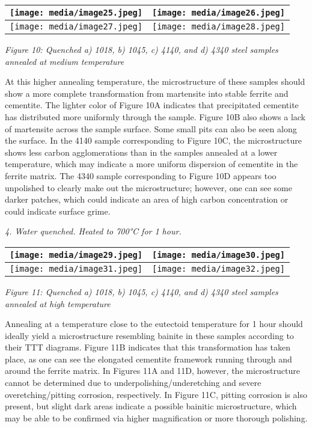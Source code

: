 \documentclass[]{article}
\begin{document}
\begin{longtable}[]{@{}ll@{}}
\toprule
\texttt{[image: media/image25.jpeg]} &
\texttt{[image: media/image26.jpeg]}\tabularnewline
\midrule
\endhead
\texttt{[image: media/image27.jpeg]} &
\texttt{[image: media/image28.jpeg]}\tabularnewline
\bottomrule
\end{longtable}

\emph{Figure 10: Quenched a) 1018, b) 1045, c) 4140, and d) 4340 steel
samples annealed at medium temperature}

At this higher annealing temperature, the microstructure of these
samples should show a more complete transformation from martensite into
stable ferrite and cementite. The lighter color of Figure 10A indicates
that precipitated cementite has distributed more uniformly through the
sample. Figure 10B also shows a lack of martensite across the sample
surface. Some small pits can also be seen along the surface. In the 4140
sample corresponding to Figure 10C, the microstructure shows less carbon
agglomerations than in the samples annealed at a lower temperature,
which may indicate a more uniform dispersion of cementite in the ferrite
matrix. The 4340 sample corresponding to Figure 10D appears too
unpolished to clearly make out the microstructure; however, one can see
some darker patches, which could indicate an area of high carbon
concentration or could indicate surface grime.

\emph{4. Water quenched. Heated to 700°C for 1 hour.}

\begin{longtable}[]{@{}ll@{}}
\toprule
\texttt{[image: media/image29.jpeg]} &
\texttt{[image: media/image30.jpeg]}\tabularnewline
\midrule
\endhead
\texttt{[image: media/image31.jpeg]} &
\texttt{[image: media/image32.jpeg]}\tabularnewline
\bottomrule
\end{longtable}

\emph{Figure 11: Quenched a) 1018, b) 1045, c) 4140, and d) 4340 steel
samples annealed at high temperature}

Annealing at a temperature close to the eutectoid temperature for 1 hour
should ideally yield a microstructure resembling bainite in these
samples according to their TTT diagrams. Figure 11B indicates that this
transformation has taken place, as one can see the elongated cementite
framework running through and around the ferrite matrix. In Figures 11A
and 11D, however, the microstructure cannot be determined due to
underpolishing/underetching and severe overetching/pitting corrosion,
respectively. In Figure 11C, pitting corrosion is also present, but
slight dark areas indicate a possible bainitic microstructure, which may
be able to be confirmed via higher magnification or more thorough
polishing.
\end{document}
